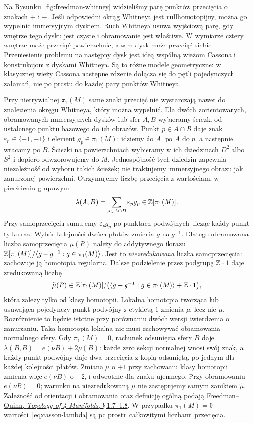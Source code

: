 Na Rysunku~\ref{fig:freedman-whitney} widzieliśmy
parę punktów przecięcia o znakach $+$ i $-$.
Jeśli odpowiedni okrąg Whitneya jest
nullhomotopijny, można go wypełnić immersyjnym
dyskiem. Ruch Whitneya usuwa wyjściową parę,
gdy wnętrze tego dysku jest czyste i obramowanie
jest właściwe. W wymiarze cztery wnętrze może
przeciąć powierzchnie, a sam dysk może przeciąć
siebie. Przeniesienie problemu na następny dysk
jest ideą wspólną wieżom Cassona i konstrukcjom
z dyskami Whitneya. Są to różne modele geometryczne:
w klasycznej wieży Cassona następne rdzenie
dołącza się do pętli pojedynczych załamań, nie
po prostu do każdej pary punktów Whitneya.

Przy nietrywialnej $\pi_1(M)$ same znaki przecięć
nie wystarczają nawet do znalezienia okręgu
Whitneya, który można wypełnić. Dla dwóch
zorientowanych, obramowanych immersyjnych dysków
lub sfer $A,B$ wybieramy ścieżki od ustalonego
punktu bazowego do ich obrazów. Punkt
$p\in A\cap B$ daje znak $\varepsilon_p\in\{+1,-1\}$
i element $g_p\in\pi_1(M)$: idziemy do $A$,
po $A$ do $p$, a następnie wracamy po $B$.
Ścieżki na powierzchniach wybieramy w ich dziedzinach
$D^2$ albo $S^2$ i dopiero odwzorowujemy do $M$.
Jednospójność tych dziedzin zapewnia niezależność od
wyboru takich ścieżek; nie traktujemy immersyjnego
obrazu jak zanurzonej powierzchni.
Otrzymujemy liczbę przecięcia z wartościami w
pierścieniu grupowym
\begin{equation}\label{eq:casson-lambda}
 \lambda(A,B)=\sum_{p\in A\cap B}
             \varepsilon_p g_p\in\mathbb{Z}[\pi_1(M)].
\end{equation}
Przy samoprzecięciu sumujemy $\varepsilon_p g_p$ po
punktach podwójnych, licząc każdy punkt tylko raz.
Wybór kolejności dwóch płatów
zmienia $g$ na $g^{-1}$. Dlatego obramowana
liczba samoprzecięcia $\mu(B)$ należy do
addytywnego ilorazu
$\mathbb{Z}[\pi_1(M)]/\langle g-g^{-1}:g\in\pi_1(M)\rangle$.
Jest to \emph{niezredukowana} liczba samoprzecięcia:
zachowuje ją homotopia regularna. Dalsze podzielenie
przez podgrupę $\mathbb{Z}\cdot 1$ daje zredukowaną liczbę
\[
 \widetilde\mu(B)\in
 \mathbb{Z}[\pi_1(M)]/
 \bigl(\langle g-g^{-1}:g\in\pi_1(M)\rangle
       +\mathbb{Z}\cdot1\bigr),
\]
która zależy tylko od klasy homotopii. Lokalna
homotopia tworząca lub usuwająca pojedynczy punkt
podwójny z etykietą $1$ zmienia $\mu$, lecz nie
$\widetilde\mu$. Rozróżnienie to będzie istotne przy
porównaniu dwóch wersji twierdzenia o zanurzaniu.
Taka homotopia lokalna nie musi zachowywać obramowania
normalnego sfery. Gdy $\pi_1(M)=0$, rachunek odsunięcia
sfery $B$ daje $\lambda(B,B)=e(\nu B)+2\mu(B)$:
każde zero sekcji normalnej wnosi swój znak, a każdy
punkt podwójny daje dwa przecięcia z kopią odsuniętą,
po jednym dla każdej kolejności płatów. Zmiana
$\mu$ o $+1$ przy zachowaniu klasy homotopii zmienia
więc $e(\nu B)$ o $-2$, i odwrotnie dla znaku ujemnego.
Przy obramowaniu $e(\nu B)=0$; warunku na niezredukowaną
$\mu$ nie zastępujemy samym zanikiem $\widetilde\mu$.
Zależność od orientacji i obramowania oraz definicję
ogólną podają
\href{https://archive.mpim-bonn.mpg.de/4789/2/FreedmanQuinn-TopologyOf4Manifolds-Reformatted2013.pdf}
{Freedman--Quinn, \emph{Topology of 4-Manifolds},
\S\,1.7--1.8}. W przypadku $\pi_1(M)=0$
wartości~\eqref{eq:casson-lambda} są po prostu
całkowitymi liczbami przecięcia.

